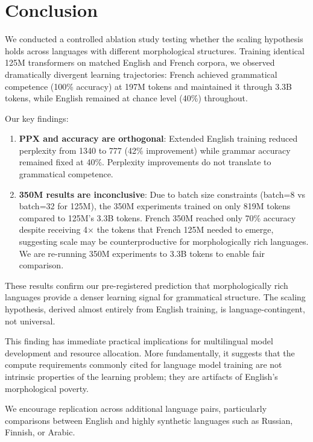 \documentclass[11pt,a4paper]{article}
\begin{document}
\section{Conclusion}

We conducted a controlled ablation study testing whether the scaling hypothesis holds across languages with different morphological structures. Training identical 125M transformers on matched English and French corpora, we observed dramatically divergent learning trajectories: French achieved grammatical competence (100\% accuracy) at 197M tokens and maintained it through 3.3B tokens, while English remained at chance level (40\%) throughout.

Our key findings:

\begin{enumerate}
    \item \textbf{PPX and accuracy are orthogonal}: Extended English training reduced perplexity from 1340 to 777 (42\% improvement) while grammar accuracy remained fixed at 40\%. Perplexity improvements do not translate to grammatical competence.

    \item \textbf{350M results are inconclusive}: Due to batch size constraints (batch=8 vs batch=32 for 125M), the 350M experiments trained on only 819M tokens compared to 125M's 3.3B tokens. French 350M reached only 70\% accuracy despite receiving 4$\times$ the tokens that French 125M needed to emerge, suggesting scale may be counterproductive for morphologically rich languages. We are re-running 350M experiments to 3.3B tokens to enable fair comparison.
\end{enumerate}

These results confirm our pre-registered prediction that morphologically rich languages provide a denser learning signal for grammatical structure. The scaling hypothesis, derived almost entirely from English training, is language-contingent, not universal.

This finding has immediate practical implications for multilingual model development and resource allocation. More fundamentally, it suggests that the compute requirements commonly cited for language model training are not intrinsic properties of the learning problem; they are artifacts of English's morphological poverty.

We encourage replication across additional language pairs, particularly comparisons between English and highly synthetic languages such as Russian, Finnish, or Arabic.
\end{document}
